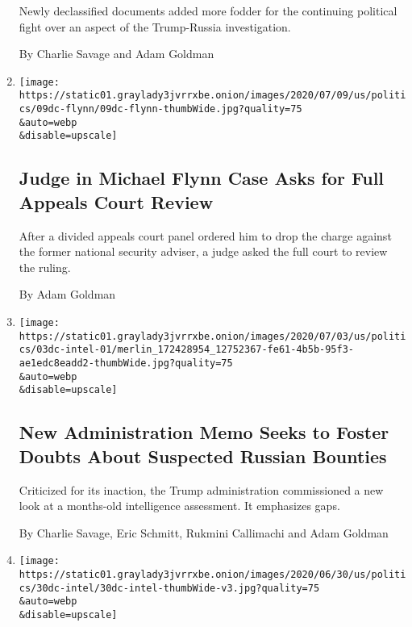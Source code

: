 \begin{enumerate}
  Newly declassified documents added more fodder for the continuing
  political fight over an aspect of the Trump-Russia investigation.

  By Charlie Savage and Adam Goldman
\item
  \href{/2020/07/09/us/politics/michael-flynn-appeals-court.html}{}

  \texttt{[image: https://static01.graylady3jvrrxbe.onion/images/2020/07/09/us/politics/09dc-flynn/09dc-flynn-thumbWide.jpg?quality=75\\\&auto=webp\\\&disable=upscale]}

  \hypertarget{judge-in-michael-flynn-case-asks-for-full-appeals-court-review}{%
  \subsection{Judge in Michael Flynn Case Asks for Full Appeals Court
  Review}\label{judge-in-michael-flynn-case-asks-for-full-appeals-court-review}}

  After a divided appeals court panel ordered him to drop the charge
  against the former national security adviser, a judge asked the full
  court to review the ruling.

  By Adam Goldman
\item
  \href{/2020/07/03/us/politics/memo-russian-bounties.html}{}

  \texttt{[image: https://static01.graylady3jvrrxbe.onion/images/2020/07/03/us/politics/03dc-intel-01/merlin\_172428954\_12752367-fe61-4b5b-95f3-ae1edc8eadd2-thumbWide.jpg?quality=75\\\&auto=webp\\\&disable=upscale]}

  \hypertarget{new-administration-memo-seeks-to-foster-doubts-about-suspected-russian-bounties}{%
  \subsection{New Administration Memo Seeks to Foster Doubts About
  Suspected Russian
  Bounties}\label{new-administration-memo-seeks-to-foster-doubts-about-suspected-russian-bounties}}

  Criticized for its inaction, the Trump administration commissioned a
  new look at a months-old intelligence assessment. It emphasizes gaps.

  By Charlie Savage, Eric Schmitt, Rukmini Callimachi and Adam Goldman
\item
  \href{/2020/06/30/us/politics/russian-bounties-afghanistan-intelligence.html}{}

  \texttt{[image: https://static01.graylady3jvrrxbe.onion/images/2020/06/30/us/politics/30dc-intel/30dc-intel-thumbWide-v3.jpg?quality=75\\\&auto=webp\\\&disable=upscale]}


\end{enumerate}
